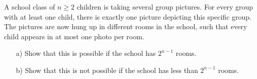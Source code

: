 A school class of $n \geq 2$ children is taking several group pictures.
For every group with at least one child, there is exactly one picture depicting this specific group.
The pictures are now hung up in different rooms in the school,
such that every child appears in at most one photo per room.

\begin{enumerate}
\item[a)] Show that this is possible if the school has $2^{n-1}$ rooms.
\item[b)] Show that this is not possible if the school has less than $2^{n-1}$ rooms.
\end{enumerate}
